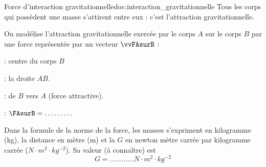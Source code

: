 \newpage
\begin{doc}{Force d'interaction gravitationnelle}{doc:interaction_gravitationnelle}
  \chevron Tous les corps qui possèdent une masse s’attirent entre eux : c’est l’attraction gravitationnelle.

  \begin{encart}
    On modélise l'attraction gravitationnelle exercée par le corps $A$ sur le corps $B$ par une force représentée par un vecteur $\vvFAsurB$ :
    
    \vspace*{-12pt}
    \begin{wrapfigure}[6]{r}{0.4\linewidth}
      \vspace*{-20pt}
    \end{wrapfigure}

    \phantom{b}
    \begin{listePoints}
      \item {} : centre du corps $B$
      \item {} : la droite $AB$.
      \item {} : de $B$ vers $A$ (force attractive).
      \item {} : $\FAsurB = \ldots\ldots\ldots$
    \end{listePoints}
      
    Dans la formule de la norme de la force, les masses s'expriment en kilogramme (kg), la distance en mètre (m) et la  $G$ en newton mètre carrée par kilogramme carrée ($\!\!\unit{N \cdot m^2 \cdot kg^{-2}}$). Sa valeur (à connaître) est 
    \begin{equation*}
      G = \ldots\ldots\ldots\ldots
      \unit{N \cdot m^2 \cdot kg^{-2}}
    \end{equation*}
  \end{encart}
\end{doc}

